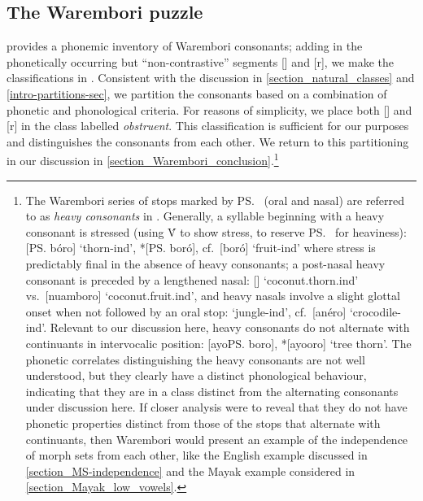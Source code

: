 \subsection{The Warembori puzzle}

\largerpage[-1]
\citet[6]{Donohue:1999} provides a phonemic inventory of  Warembori consonants; adding in the phonetically occurring but ``non-contrastive'' segments [\B] and [r], we make the classifications in . Consistent with the discussion in \textsection\ref{section_natural_classes} and \textsection\ref{intro-partitions-sec}, we partition the consonants  based on a combination of phonetic and phonological criteria. For reasons of simplicity, we place both [\B] and [r] in the class labelled \textit{obstruent}.   This classification is sufficient for our purposes and distinguishes the consonants from each other. We return to this partitioning in our discussion in \Sec\ref{section_Warembori_conclusion}.\footnote{The Warembori series of stops marked by \ps\ (oral and nasal) are referred to as \textit{heavy consonants} in \citet[8]{Donohue:1999}. Generally, a syllable beginning with a heavy consonant is stressed (using \'V to show stress, to reserve \ps\ for heaviness): [\ps bóro] `thorn-{\sc ind}', *[\ps boró], cf.\ [boró] `fruit-{\sc ind}' where stress is predictably final in the absence of heavy consonants; a post-nasal heavy consonant is preceded by a lengthened nasal: [] `coconut.thorn.{\sc ind}' vs.\ [nuamboro] `coconut.fruit.{\sc ind}', and heavy nasals involve a slight glottal onset when not followed by an oral stop:  `jungle-{\sc ind}', cf.\ [anéro] `crocodile-{\sc ind}'. Relevant to our discussion here, heavy consonants do not alternate with continuants in intervocalic position: [ayo\ps boro], *[ayo\B oro] `tree thorn'. The phonetic correlates distinguishing the heavy consonants are not well understood, but they clearly have a distinct phonological behaviour, indicating that they are in a class distinct from the alternating consonants under discussion here. If closer analysis were to reveal that they do not have phonetic properties distinct from those of the stops that alternate with continuants, then Warembori would  present an example of the independence of morph sets from each other,  like the English example discussed in \Sec\ref{section_MS-independence} and the Mayak example considered in \Sec\ref{section_Mayak_low_vowels}.\label{Warembori-heavies-note}}


